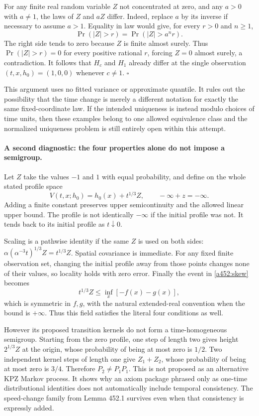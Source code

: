 \documentclass[11pt]{article}
\begin{document}
For any finite real random variable $Z$ not concentrated at zero, and
any $a>0$ with $a\ne1$, the laws of $Z$ and $aZ$ differ. Indeed, replace
$a$ by its inverse if necessary to assume $a>1$. Equality in law would
give, for every $r>0$ and $n\ge1$,
\[
 \Pr(|Z|>r)=\Pr(|Z|>a^nr).
\]
The right side tends to zero because $Z$ is finite almost surely. Thus
$\Pr(|Z|>r)=0$ for every positive rational $r$, forcing $Z=0$ almost
surely, a contradiction. It follows that $H_c$ and $H_1$ already differ
at the single observation $(t,x,h_0)=(1,0,0)$ whenever $c\ne1$.
\hfill$\square$

This argument uses no fitted variance or approximate quantile. It rules
out the possibility that the time change is merely a different notation
for exactly the same fixed-coordinate law. If the intended uniqueness
is instead modulo choices of time units, then these examples belong to
one allowed equivalence class and the normalized uniqueness problem is
still entirely open within this attempt.

\paragraph{A second diagnostic: the four properties alone do not impose a semigroup.}
Let $Z$ take the values $-1$ and $1$ with equal probability, and define
on the whole stated profile space
\begin{equation}\label{a452:vertical}
 V(t,x;h_0)=h_0(x)+t^{1/3}Z,
 \qquad -\infty+z=-\infty.
\end{equation}
Adding a finite constant preserves upper semicontinuity and the allowed
linear upper bound. The profile is not identically $-\infty$ if the
initial profile was not. It tends back to its initial profile as
$t\downarrow0$.

Scaling is a pathwise identity if the same $Z$ is used on both sides:
$\alpha(\alpha^{-3}t)^{1/3}Z=t^{1/3}Z$. Spatial covariance is immediate.
For any fixed finite observation set, changing the initial profile away
from those points changes none of their values, so locality holds with
zero error. Finally the event in \eqref{a452:skew} becomes
\[
 t^{1/3}Z\le\inf_x[-f(x)-g(x)],
\]
which is symmetric in $f,g$, with the natural extended-real convention
when the bound is $+\infty$. Thus this field satisfies the literal four
conditions as well.

However its proposed transition kernels do not form a time-homogeneous
semigroup. Starting from the zero profile, one step of length two gives
height $2^{1/3}Z$ at the origin, whose probability of being at most zero
is $1/2$. Two independent kernel steps of length one give $Z_1+Z_2$,
whose probability of being at most zero is $3/4$. Therefore
$P_2\ne P_1P_1$. This is not proposed as an alternative KPZ Markov
process. It shows why an axiom package phrased only as one-time
distributional identities does not automatically include temporal
consistency. The speed-change family from Lemma 452.1 survives even
when that consistency is expressly added.
\end{document}
